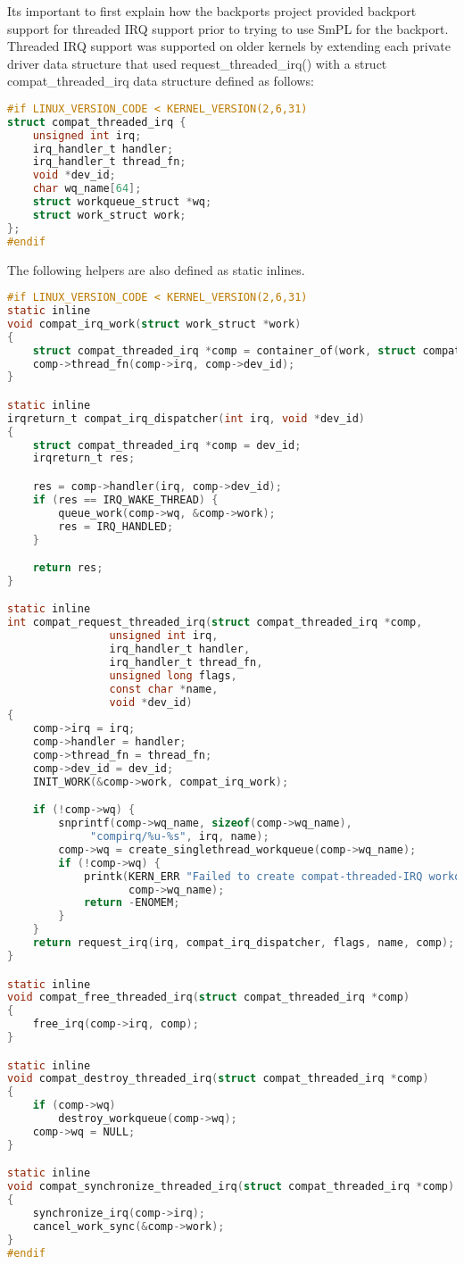 \documentclass[a4paper,10pt]{article}
\begin{document}
Its important to first explain how the backports project provided backport
support for threaded IRQ support prior to trying to use SmPL for the backport.
Threaded IRQ support was supported on older kernels by extending each private
driver data structure that used request\_threaded\_irq() with a struct
compat\_threaded\_irq data structure defined as follows:

\begin{lstlisting}[language=C]
#if LINUX_VERSION_CODE < KERNEL_VERSION(2,6,31)
struct compat_threaded_irq {
	unsigned int irq;
	irq_handler_t handler;
	irq_handler_t thread_fn;
	void *dev_id;
	char wq_name[64];
	struct workqueue_struct *wq;
	struct work_struct work;
};
#endif
\end{lstlisting}

The following helpers are also defined as static inlines.

\begin{lstlisting}[language=C]
#if LINUX_VERSION_CODE < KERNEL_VERSION(2,6,31)
static inline
void compat_irq_work(struct work_struct *work)
{
	struct compat_threaded_irq *comp = container_of(work, struct compat_threaded_irq, work);
	comp->thread_fn(comp->irq, comp->dev_id);
}

static inline
irqreturn_t compat_irq_dispatcher(int irq, void *dev_id)
{
	struct compat_threaded_irq *comp = dev_id;
	irqreturn_t res;

	res = comp->handler(irq, comp->dev_id);
	if (res == IRQ_WAKE_THREAD) {
		queue_work(comp->wq, &comp->work);
		res = IRQ_HANDLED;
	}

	return res;
}

static inline
int compat_request_threaded_irq(struct compat_threaded_irq *comp,
				unsigned int irq,
				irq_handler_t handler,
				irq_handler_t thread_fn,
				unsigned long flags,
				const char *name,
				void *dev_id)
{
	comp->irq = irq;
	comp->handler = handler;
	comp->thread_fn = thread_fn;
	comp->dev_id = dev_id;
	INIT_WORK(&comp->work, compat_irq_work);

	if (!comp->wq) {
		snprintf(comp->wq_name, sizeof(comp->wq_name),
			 "compirq/%u-%s", irq, name);
		comp->wq = create_singlethread_workqueue(comp->wq_name);
		if (!comp->wq) {
			printk(KERN_ERR "Failed to create compat-threaded-IRQ workqueue %s\n",
			       comp->wq_name);
			return -ENOMEM;
		}
	}
	return request_irq(irq, compat_irq_dispatcher, flags, name, comp);
}

static inline
void compat_free_threaded_irq(struct compat_threaded_irq *comp)
{
	free_irq(comp->irq, comp);
}

static inline
void compat_destroy_threaded_irq(struct compat_threaded_irq *comp)
{
	if (comp->wq)
		destroy_workqueue(comp->wq);
	comp->wq = NULL;
}

static inline
void compat_synchronize_threaded_irq(struct compat_threaded_irq *comp)
{
	synchronize_irq(comp->irq);
	cancel_work_sync(&comp->work);
}
#endif
\end{lstlisting}
\end{document}
